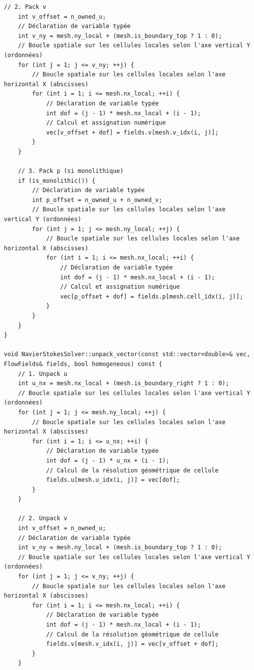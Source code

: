 \documentclass[10pt,a4paper,oneside]{book}
\begin{document}
\begin{lstlisting}[language={[11]C++}]
    // 2. Pack v
    int v_offset = n_owned_u;
    // Déclaration de variable typée
    int v_ny = mesh.ny_local + (mesh.is_boundary_top ? 1 : 0);
    // Boucle spatiale sur les cellules locales selon l'axe vertical Y (ordonnées)
    for (int j = 1; j <= v_ny; ++j) {
        // Boucle spatiale sur les cellules locales selon l'axe horizontal X (abscisses)
        for (int i = 1; i <= mesh.nx_local; ++i) {
            // Déclaration de variable typée
            int dof = (j - 1) * mesh.nx_local + (i - 1);
            // Calcul et assignation numérique
            vec[v_offset + dof] = fields.v[mesh.v_idx(i, j)];
        }
    }

    // 3. Pack p (si monolithique)
    if (is_monolithic()) {
        // Déclaration de variable typée
        int p_offset = n_owned_u + n_owned_v;
        // Boucle spatiale sur les cellules locales selon l'axe vertical Y (ordonnées)
        for (int j = 1; j <= mesh.ny_local; ++j) {
            // Boucle spatiale sur les cellules locales selon l'axe horizontal X (abscisses)
            for (int i = 1; i <= mesh.nx_local; ++i) {
                // Déclaration de variable typée
                int dof = (j - 1) * mesh.nx_local + (i - 1);
                // Calcul et assignation numérique
                vec[p_offset + dof] = fields.p[mesh.cell_idx(i, j)];
            }
        }
    }
}

void NavierStokesSolver::unpack_vector(const std::vector<double>& vec, FlowFields& fields, bool homogeneous) const {
    // 1. Unpack u
    int u_nx = mesh.nx_local + (mesh.is_boundary_right ? 1 : 0);
    // Boucle spatiale sur les cellules locales selon l'axe vertical Y (ordonnées)
    for (int j = 1; j <= mesh.ny_local; ++j) {
        // Boucle spatiale sur les cellules locales selon l'axe horizontal X (abscisses)
        for (int i = 1; i <= u_nx; ++i) {
            // Déclaration de variable typée
            int dof = (j - 1) * u_nx + (i - 1);
            // Calcul de la résolution géométrique de cellule
            fields.u[mesh.u_idx(i, j)] = vec[dof];
        }
    }

    // 2. Unpack v
    int v_offset = n_owned_u;
    // Déclaration de variable typée
    int v_ny = mesh.ny_local + (mesh.is_boundary_top ? 1 : 0);
    // Boucle spatiale sur les cellules locales selon l'axe vertical Y (ordonnées)
    for (int j = 1; j <= v_ny; ++j) {
        // Boucle spatiale sur les cellules locales selon l'axe horizontal X (abscisses)
        for (int i = 1; i <= mesh.nx_local; ++i) {
            // Déclaration de variable typée
            int dof = (j - 1) * mesh.nx_local + (i - 1);
            // Calcul de la résolution géométrique de cellule
            fields.v[mesh.v_idx(i, j)] = vec[v_offset + dof];
        }
    }


\end{lstlisting}
\end{document}
